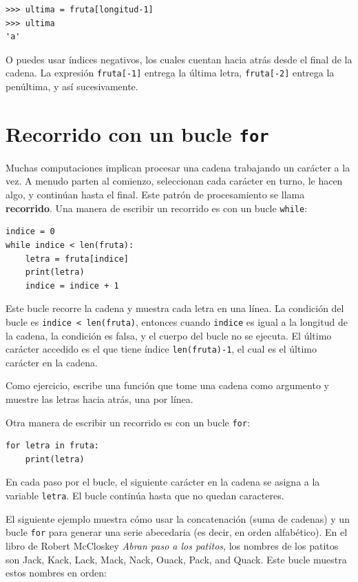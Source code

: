 \documentclass[10pt]{book}
\begin{document}
\begin{verbatim}
>>> ultima = fruta[longitud-1]
>>> ultima
'a'
\end{verbatim}
%
O puedes usar índices negativos, los cuales cuentan hacia atrás desde
el final de la cadena.  La expresión {\tt fruta[-1]} entrega la última
letra, {\tt fruta[-2]} entrega la penúltima, y así sucesivamente.


\section{Recorrido con un bucle {\tt for}}
\label{for}

Muchas computaciones implican procesar una cadena trabajando un carácter a la
vez.  A menudo parten al comienzo, seleccionan cada carácter en
turno, le hacen algo, y continúan hasta el final.  Este patrón de
procesamiento se llama {\bf recorrido}.  Una manera de escribir un recorrido
es con un bucle {\tt while}:

\begin{verbatim}
indice = 0
while indice < len(fruta):
    letra = fruta[indice]
    print(letra)
    indice = indice + 1
\end{verbatim}
%
Este bucle recorre la cadena y muestra cada letra en una
línea.  La condición del bucle es {\tt indice < len(fruta)}, entonces
cuando {\tt indice} es igual a la longitud de la cadena, la
condición es falsa, y el cuerpo del bucle no se ejecuta.  El
último carácter accedido es el que tiene índice {\tt len(fruta)-1},
el cual es el último carácter en la cadena.

Como ejercicio, escribe una función que tome una cadena como argumento
y muestre las letras hacia atrás, una por línea.

Otra manera de escribir un recorrido es con un bucle {\tt for}:

\begin{verbatim}
for letra in fruta:
    print(letra)
\end{verbatim}
%
En cada paso por el bucle, el siguiente carácter en la cadena se asigna
a la variable {\tt letra}.  El bucle continúa hasta que no quedan
caracteres.

El siguiente ejemplo muestra cómo usar la concatenación (suma de cadenas)
y un bucle {\tt for} para generar una serie abecedaria (es decir, en
orden alfabético).  En el libro de Robert McCloskey {\em Abran
paso a los patitos}, los nombres de los patitos son Jack, Kack, Lack,
Mack, Nack, Ouack, Pack, and Quack.  Este bucle muestra estos nombres en
orden:
\end{document}

